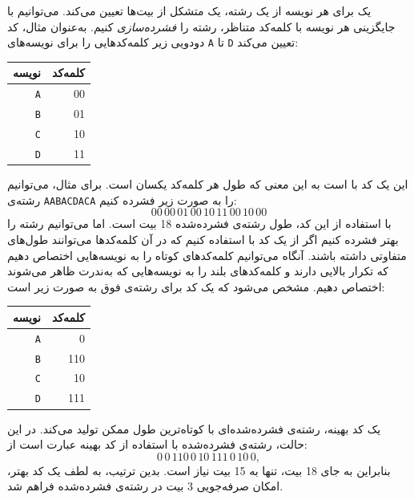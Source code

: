 
یک  برای هر نویسه
از یک رشته، یک  متشکل از بیت‌ها تعیین می‌کند.
می‌توانیم با جایگزینی هر نویسه با کلمه‌کد متناظر،
رشته را \emph{فشرده‌سازی} کنیم.
به‌عنوان مثال، کد دودویی زیر
کلمه‌کدهایی را برای نویسه‌های
\texttt{A} تا \texttt{D} تعیین می‌کند:
\begin{center}
\begin{tabular}{rr}
نویسه & کلمه‌کد \\
\hline
\texttt{A} & 00 \\
\texttt{B} & 01 \\
\texttt{C} & 10 \\
\texttt{D} & 11 \\
\end{tabular}
\end{center}
این یک کد با  است
به این معنی که طول هر کلمه‌کد یکسان است.
برای مثال، می‌توانیم رشته‌ی
\texttt{AABACDACA} را به صورت زیر فشرده کنیم:
\[00\,00\,01\,00\,10\,11\,00\,10\,00\]
با استفاده از این کد، طول رشته‌ی فشرده‌شده
18 بیت است.
اما می‌توانیم رشته را بهتر فشرده کنیم
اگر از یک کد با  استفاده کنیم
که در آن کلمه‌کدها می‌توانند طول‌های متفاوتی داشته باشند.
آنگاه می‌توانیم کلمه‌کدهای کوتاه را به نویسه‌هایی اختصاص دهیم
که تکرار بالایی دارند
و کلمه‌کدهای بلند را به نویسه‌هایی
که به‌ندرت ظاهر می‌شوند اختصاص دهیم.
مشخص می‌شود که یک کد 
برای رشته‌ی فوق به صورت زیر است:
\begin{center}
\begin{tabular}{rr}
نویسه & کلمه‌کد \\
\hline
\texttt{A} & 0 \\
\texttt{B} & 110 \\
\texttt{C} & 10 \\
\texttt{D} & 111 \\
\end{tabular}
\end{center}
یک کد بهینه، رشته‌ی فشرده‌شده‌ای با
کوتاه‌ترین طول ممکن تولید می‌کند.
در این حالت، رشته‌ی فشرده‌شده با استفاده از
کد بهینه عبارت است از:
\[0\,0\,110\,0\,10\,111\,0\,10\,0,\]
بنابراین به جای 18 بیت، تنها به 15 بیت نیاز است.
بدین ترتیب، به لطف یک کد بهتر، امکان
صرفه‌جویی 3 بیت در رشته‌ی فشرده‌شده فراهم شد.

